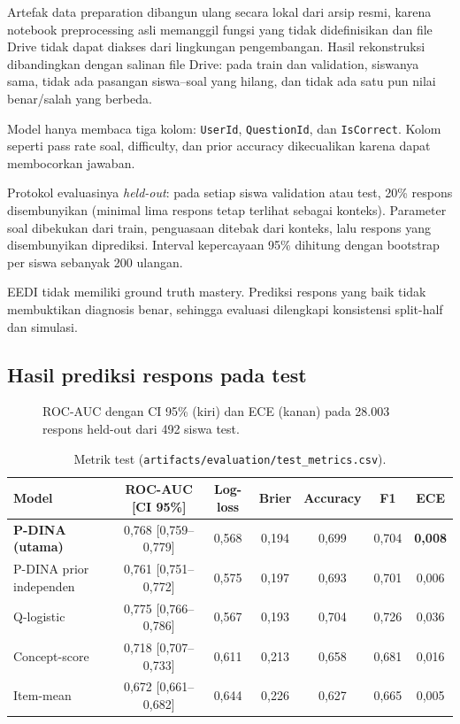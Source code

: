 \documentclass[11pt,a4paper]{article}
\begin{document}
Artefak data preparation dibangun ulang secara lokal dari arsip resmi, karena notebook preprocessing asli memanggil
fungsi yang tidak didefinisikan dan file Drive tidak dapat diakses dari lingkungan pengembangan. Hasil rekonstruksi
dibandingkan dengan salinan file Drive: pada train dan validation, siswanya sama, tidak ada pasangan siswa--soal yang
hilang, dan tidak ada satu pun nilai benar/salah yang berbeda.

Model hanya membaca tiga kolom: \texttt{UserId}, \texttt{QuestionId}, dan \texttt{IsCorrect}. Kolom seperti pass rate
soal, difficulty, dan prior accuracy dikecualikan karena dapat membocorkan jawaban.

Protokol evaluasinya \emph{held-out}: pada setiap siswa validation atau test, 20\% respons disembunyikan (minimal lima
respons tetap terlihat sebagai konteks). Parameter soal dibekukan dari train, penguasaan ditebak dari konteks, lalu
respons yang disembunyikan diprediksi. Interval kepercayaan 95\% dihitung dengan bootstrap per siswa sebanyak 200
ulangan.

\begin{peringatan}
  EEDI tidak memiliki ground truth mastery. Prediksi respons yang baik tidak membuktikan diagnosis benar, sehingga
  evaluasi dilengkapi konsistensi split-half dan simulasi.
\end{peringatan}

\subsection{Hasil prediksi respons pada test}

\begin{figure}[h]
  \centering
  \setlength\figH{4.2cm}
  
  \caption{ROC-AUC dengan CI 95\% (kiri) dan ECE (kanan) pada 28.003 respons held-out dari 492 siswa test.}
\end{figure}

\begin{table}[h]
  \centering\small
  \begin{tabular}{@{}lcccccc@{}}
    \toprule
    Model & ROC-AUC [CI 95\%] & Log-loss & Brier & Accuracy & F1 & ECE \\
    \midrule
    \rowcolor{navy!8}\textbf{P-DINA (utama)} & 0,768 [0,759--0,779] & 0,568 & 0,194 & 0,699 & 0,704 & \textbf{0,008} \\
    P-DINA prior independen & 0,761 [0,751--0,772] & 0,575 & 0,197 & 0,693 & 0,701 & 0,006 \\
    Q-logistic & 0,775 [0,766--0,786] & 0,567 & 0,193 & 0,704 & 0,726 & 0,036 \\
    Concept-score & 0,718 [0,707--0,733] & 0,611 & 0,213 & 0,658 & 0,681 & 0,016 \\
    Item-mean & 0,672 [0,661--0,682] & 0,644 & 0,226 & 0,627 & 0,665 & 0,005 \\
    \bottomrule
  \end{tabular}
  \caption{Metrik test (\texttt{artifacts/evaluation/test\_metrics.csv}).}
\end{table}
\end{document}
